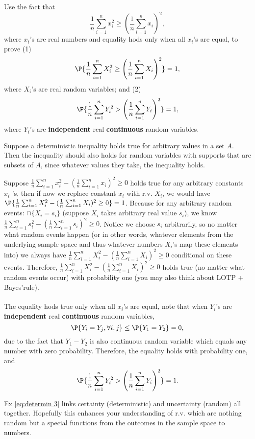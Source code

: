  \begin{exercise}\label{eq:determin 3}
	Use the fact that  
	$$\frac{1}{n}\sum_{i=1}^n x_i^2 \geq \left(\frac{1}{n}\sum_{i=1}^n x_i \right)^2,$$
	where $x_i$'s are real numbers and equality hods only when all $x_i$'s are equal, to prove (1) 
	$$\P{\frac{1}{n}\sum_{i=1}^n X_i^2 \geq \left(\frac{1}{n}\sum_{i=1}^n X_i \right)^2}=1,$$
	where $X_i$'s are real random variables; and (2)
	$$\P{\frac{1}{n}\sum_{i=1}^n Y_i^2 > \left(\frac{1}{n}\sum_{i=1}^n Y_i \right)^2}=1,$$
	where $Y_i$'s are \textbf{independent} real \textbf{continuous} random variables. 	
	\begin{hint}
		Suppose a deterministic inequality holds true for arbitrary values in a set $A$. Then the inequality should also holds for random variables with supports that are subsets of $A$, since whatever values they take, the inequality holds.  
	\end{hint}
	\begin{solution} 
		Suppose $\frac{1}{n}\sum_{i=1}^n  x_i^2  -  ( \frac{1}{n}\sum_{i=1}^n  x_i )^2 \geq 0$  holds true for any arbitrary constants $x_i$ 's, then if now we replace constant $x_i$ with r.v. $X_i$, we would have $\P{\frac{1}{n}\sum_{i=1}^n  X_i^2  -  ( \frac{1}{n}\sum_{i=1}^n  X_i )^2 \geq 0}=1$.
		Because for any arbitrary random events: $\cap \{X_i=s_i\}$ (suppose $X_i$ takes arbitrary real value $s_i$), we know $\frac{1}{n}\sum_{i=1}^n  s_i^2  -  ( \frac{1}{n}\sum_{i=1}^n  s_i )^2 \geq 0$. Notice we choose $s_i$ arbitrarily, so no matter what random events happen (or in other words, whatever elements from the underlying sample space and thus whatever numbers $X_i$'s map these elements into) we always have $\frac{1}{n}\sum_{i=1}^n  X_i^2  -  ( \frac{1}{n}\sum_{i=1}^n  X_i )^2 \geq 0$ conditional on these events.  Therefore, $\frac{1}{n}\sum_{i=1}^n  X_i^2  -  ( \frac{1}{n}\sum_{i=1}^n  X_i )^2 \geq 0$ holds true (no matter what random events occur) with probability one (you may also think about LOTP + Bayes'rule). \\~\\
		The equality hods true only when  all $x_i$'s are equal, note that when $Y_i$'s are \textbf{independent} real \textbf{continuous} random variables,
			$$\P{Y_i=Y_j, \forall i,j}\leq \P{ Y_1=Y_2}=0,$$
			due to the fact that $Y_1-Y_2$ is also continuous random variable which equals any number with zero probability. 
		Therefore, the equality holds with probability one, and	
		$$\P{\frac{1}{n}\sum_{i=1}^n Y_i^2 > \left(\frac{1}{n}\sum_{i=1}^n Y_i \right)^2}=1.$$
	\end{solution}
\end{exercise}
\begin{remark}
 Ex \ref{eq:determin 3}	links certainty (deterministic) and uncertainty (random) all together. Hopefully this enhances your understanding of r.v. which are nothing random but a special functions from the outcomes in the sample space to numbers.
\end{remark}

